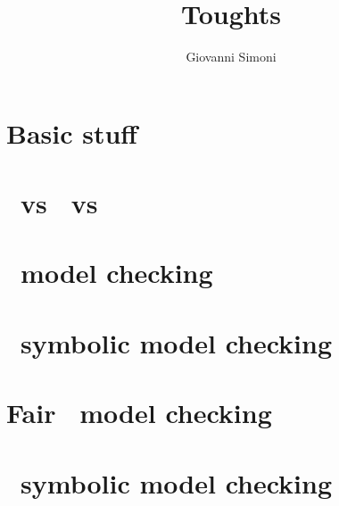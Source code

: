 \documentclass[a3paper]{article}
\title{Toughts}
\author{Giovanni Simoni}
\begin{document}
    \maketitle

    \section{Basic stuff}
    
    \newpage

    \section{\LTL\ vs \CTL\ vs \CTLs}
    
    \newpage

    \section{\CTL\ model checking}
    
    \newpage

    \section{\CTL\ symbolic model checking}
    
    \newpage

    \section{Fair \CTL\ model checking}
    
    \newpage

    \section{\LTL\ symbolic model checking}
    
    \newpage
\end{document}
